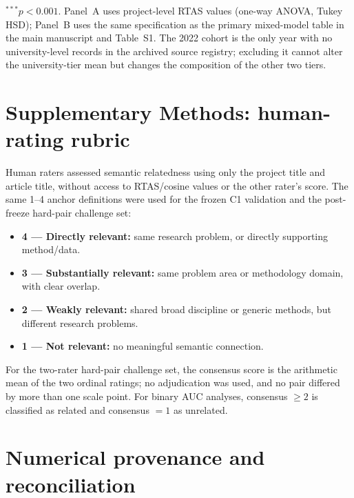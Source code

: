 \documentclass[a4paper,11pt]{article}
\begin{document}
\begin{table}[htbp]
\vspace{1mm}
\footnotesize $^{***}p<0.001$. Panel~A uses project-level RTAS values (one-way ANOVA, Tukey HSD); Panel~B uses the same specification as the primary mixed-model table in the main manuscript and Table~S1. The 2022 cohort is the only year with no university-level records in the archived source registry; excluding it cannot alter the university-tier mean but changes the composition of the other two tiers.
\end{table}

\clearpage
\section*{Supplementary Methods: human-rating rubric}

Human raters assessed semantic relatedness using only the project title and article title, without access to RTAS/cosine values or the other rater's score. The same 1--4 anchor definitions were used for the frozen C1 validation and the post-freeze hard-pair challenge set:

\begin{itemize}
\item \textbf{4 --- Directly relevant:} same research problem, or directly supporting method/data.
\item \textbf{3 --- Substantially relevant:} same problem area or methodology domain, with clear overlap.
\item \textbf{2 --- Weakly relevant:} shared broad discipline or generic methods, but different research problems.
\item \textbf{1 --- Not relevant:} no meaningful semantic connection.
\end{itemize}

For the two-rater hard-pair challenge set, the consensus score is the arithmetic mean of the two ordinal ratings; no adjudication was used, and no pair differed by more than one scale point. For binary AUC analyses, consensus $\ge2$ is classified as related and consensus $=1$ as unrelated.


\clearpage
\section*{Numerical provenance and reconciliation}
\end{document}
